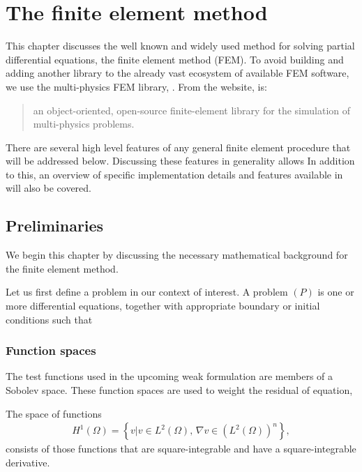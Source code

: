 \chapter{The finite element method}
\label{sec:fem}

This chapter discusses the well known and widely used method for solving partial differential equations, the finite element method (FEM).
To avoid building and adding another library to the already vast ecosystem of available FEM software, we use the multi-physics FEM library, \oomph.
From the website, \oomph is:
\begin{quote}
	an object-oriented, open-source finite-element library for the simulation of multi-physics problems. \cite{oomph}
\end{quote}
There are several high level features of any general finite element procedure that will be addressed below.
Discussing these features in generality allows 
In addition to this, an overview of specific implementation details and features available in \oomph will also be covered.





\section{Preliminaries}

We begin this chapter by discussing the necessary mathematical background for the finite element method.

Let us first define a problem in our context of interest.
A problem $(P)$ is one or more differential equations, together with appropriate boundary or initial conditions such that 

\iffalse WHAT DO WE NEED TO INCLUDE?

* Sobolev spaces
* Hilbert spaces 
* Banach spaces
* Norms/inner products

\fi



\subsection{Function spaces}
The test functions used in the upcoming weak formulation are members of a Sobolev space.
These function spaces are used to weight the residual of equation, 

The space of functions
\begin{align}
	H^1(\Omega) = \left\{ v | v \in L^2(\Omega), \, \nabla v \in (L^2(\Omega))^n \right\},
\end{align}
consists of those functions that are square-integrable and have a square-integrable derivative.



